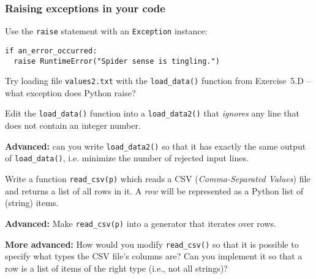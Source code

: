 \documentclass[english,serif,mathserif,xcolor=pdftex,dvipsnames,table]{beamer}
\begin{document}
\begin{frame}[fragile]
  \frametitle{Raising exceptions in your code}
  Use the \lstinline|raise| statement with an \texttt{Exception}
  instance:
\begin{lstlisting}
if an_error_occurred:
  raise RuntimeError("Spider sense is tingling.")
\end{lstlisting}
\end{frame}


\begin{frame}
  \begin{exercise*}[6.A]
    Try loading file \texttt{values2.txt} with the \lstinline`load_data()`
    function from Exercise~5.D -- what exception does Python raise?

    \+
    Edit the \lstinline`load_data()` function into a \lstinline`load_data2()`
    that \emph{ignores} any line that does not contain an integer number.

    \+
    \textbf{Advanced:} can you write \lstinline`load_data2()` so that it has
    exactly the same output of \lstinline`load_data()`, i.e. minimize the number
    of rejected input lines.
  \end{exercise*}
\end{frame}

\begin{frame}
  \begin{exercise*}[6.B]
    Write a function \lstinline|read_csv(p)| which reads a CSV
    (\emph{Comma-Separated Values}) file and returns a list of all
    rows in it.  A \emph{row} will be represented as a Python list of
    (string) items.

    \+ \textbf{Advanced:} Make \lstinline|read_csv(p)| into a
    generator that iterates over rows.

    \+ \textbf{More advanced:} How would you modify
    \lstinline|read_csv()| so that it is possible to specify what
    types the CSV file's columns are?  Can you implement it so that a
    row is a list of items of the right type (i.e., not all strings)?
  \end{exercise*}

\end{frame}
\end{document}
